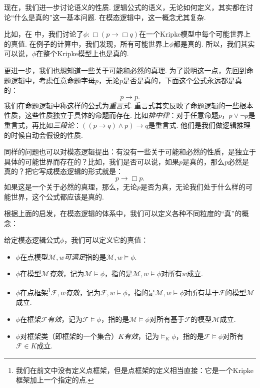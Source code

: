 现在，我们进一步讨论语义的性质. 逻辑公式的语义，无论如何定义，其实都在讨论“什么是真的”这一基本问题. 在模态逻辑中，这一概念尤其复杂. 

比如，在 中，我们讨论了$\phi:\Box (p\to\Box q)$在一个Kripke模型中每个可能世界上的真值. 在例子的计算中，我们发现，所有可能世界上$\phi$都是真的. 所以，我们其实可以说，$\phi$在整个Kripke模型上也是真的. 

更进一步，我们也想知道一些关于可能和必然的真理. 为了说明这一点，先回到命题逻辑中，考虑任意命题字母$p$，无论$p$是否是真的，下面这个公式永远都是真的：
\[p\to p.\]
我们在命题逻辑中称这样的公式为\textit{重言式}. 重言式其实反映了命题逻辑的一些根本性质，这些性质独立于具体的命题而存在. 比如\textit{排中律}：对于任意命题$p$，$p\vee\neg p$是重言式，再比如\textit{三段论}：$((p\to q)\wedge p)\to q$是重言式. 他们是我们做逻辑推理的时候自动会假设的性质. 

同样的问题也可以对模态逻辑提出：有没有一些关于可能和必然的性质，是独立于具体的可能世界而存在的？比如，我们是否可以说，如果$p$是真的，那么$p$必然是真的？把它写成模态逻辑的形式就是：
\[p\to \Box p.\]
如果这是一个关于必然的真理，那么，无论$p$是否为真，无论我们处于什么样的可能世界，这个公式都应该是真的. 

根据上面的启发，在模态逻辑的体系中，我们可以定义各种不同粒度的“真”的概念：

\begin{definition}[模态逻辑的真值]
给定模态逻辑公式$\phi$，我们可以定义它的真值：
\begin{itemize}
\item $\phi$在点模型$\mathcal M,w$\textit{可满足}指的是$\mathcal M,w\vDash \phi$. 
\item $\phi$在模型$\mathcal M$\textit{有效}，记为$\mathcal M\vDash \phi$，指的是$\mathcal M,w\vDash\phi$对所有$w$成立. 
\item $\phi$在点框架\footnote{我们在前文中没有定义点框架，但是点框架的定义相当直接：它是一个Kripke框架加上一个指定的点. }$\mathcal F,w$\textit{有效}，记为$\mathcal F,w\vDash \phi$，指的是$\mathcal M,w\vDash\phi$对所有基于$\mathcal F$的模型$\mathcal M$成立. 
\item $\phi$在框架$\mathcal F$\textit{有效}，记为$\mathcal F\vDash \phi$，指的是$\mathcal M\vDash\phi$对所有基于$\mathcal F$的模型$\mathcal M$成立. 
\item $\phi$对框架类（即框架的一个集合）$K$\textit{有效}，记为$\vDash_K\phi$，指的是$\mathcal F\vDash\phi$对所有$\mathcal F\in K$成立. 
\end{itemize}
\end{definition}

